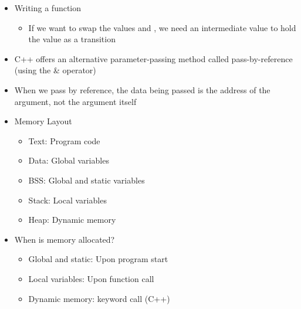 \begin{itemize}

  \item Writing a  function

    \begin{itemize}

      \item If we want to swap the values  and , we need an intermediate value to hold the value as a transition

    \end{itemize}

  \item C++ offers an alternative parameter-passing method called pass-by-reference (using the \& operator)

  \item When we pass by reference, the data being passed is the address of the argument, not the argument itself

  \item Memory Layout

    \begin{itemize}

      \item Text: Program code

      \item Data: Global variables

      \item BSS: Global and static variables

      \item Stack: Local variables

      \item Heap: Dynamic memory

    \end{itemize}

  \item When is memory allocated?

    \begin{itemize}

      \item Global and static: Upon program start

      \item Local variables: Upon function call

      \item Dynamic memory:  keyword call (C++)

    \end{itemize}


\end{itemize}
